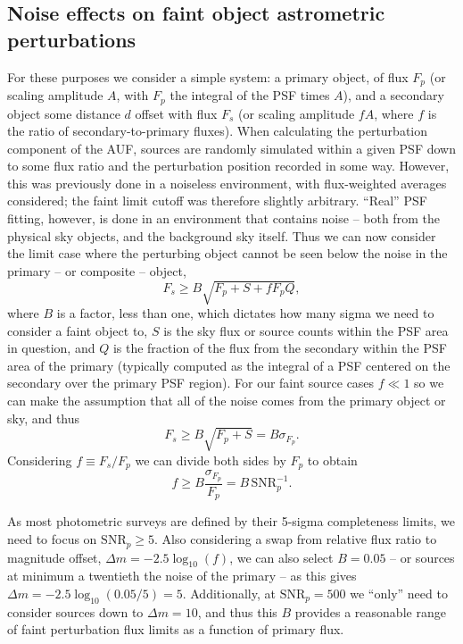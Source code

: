 \documentclass[fleqn,usenatbib]{mnras}
\begin{document}
\subsection{Noise effects on faint object astrometric perturbations}
For these purposes we consider a simple system: a primary object, of flux $F_p$ (or scaling amplitude $A$, with $F_p$ the integral of the PSF times $A$), and a secondary object some distance $d$ offset with flux $F_s$ (or scaling amplitude $fA$, where $f$ is the ratio of secondary-to-primary fluxes). When calculating the perturbation component of the AUF, sources are randomly simulated within a given PSF down to some flux ratio and the perturbation position recorded in some way. However, this was previously done in a noiseless environment, with flux-weighted averages considered; the faint limit cutoff was therefore slightly arbitrary. ``Real'' PSF fitting, however, is done in an environment that contains noise -- both from the physical sky objects, and the background sky itself. Thus we can now consider the limit case where the perturbing object cannot be seen below the noise in the primary -- or composite -- object,
\begin{equation}
    F_s \geq B\sqrt{F_p + S + fF_pQ},
\end{equation}
where $B$ is a factor, less than one, which dictates how many sigma we need to consider a faint object to, $S$ is the sky flux or source counts within the PSF area in question, and $Q$ is the fraction of the flux from the secondary within the PSF area of the primary (typically computed as the integral of a PSF centered on the secondary over the primary PSF region). For our faint source cases $f \ll 1$ so we can make the assumption that all of the noise comes from the primary object or sky, and thus
\begin{equation}
    F_s \geq B\sqrt{F_p + S} = B\sigma_{F_p}.
\end{equation}
Considering $f \equiv F_s/F_p$ we can divide both sides by $F_p$ to obtain
\begin{equation}
    f \geq B\frac{\sigma_{F_p}}{F_p} = B\,\mathrm{SNR}_p^{-1}.
\end{equation}

As most photometric surveys are defined by their 5-sigma completeness limits, we need to focus on $\mathrm{SNR}_p \geq 5$. Also considering a swap from relative flux ratio to magnitude offset, $\Delta m = -2.5 \log_{10}(f)$, we can also select $B=0.05$ -- or sources at minimum a twentieth the noise of the primary -- as this gives $\Delta m = -2.5 \log_{10}(0.05/5) = 5$. Additionally, at $\mathrm{SNR}_p = 500$ we ``only'' need to consider sources down to $\Delta m = 10$, and thus this $B$ provides a reasonable range of faint perturbation flux limits as a function of primary flux.
\end{document}
